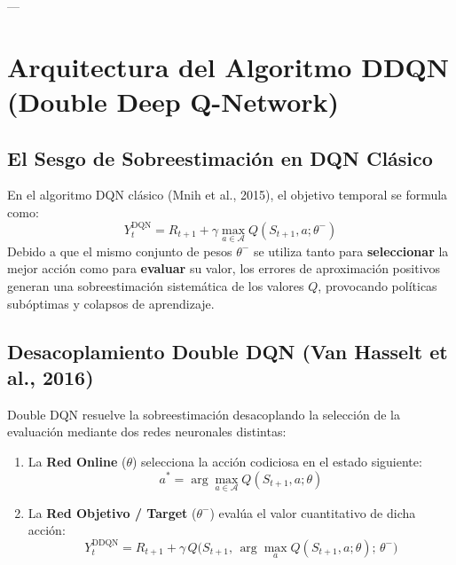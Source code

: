 \documentclass[11pt,letterpaper]{article}
\begin{document}
---

\section{Arquitectura del Algoritmo DDQN (Double Deep Q-Network)}

\subsection{El Sesgo de Sobreestimación en DQN Clásico}
En el algoritmo DQN clásico (Mnih et al., 2015), el objetivo temporal se formula como:
\begin{equation}
    Y_t^{\text{DQN}} = R_{t+1} + \gamma \max_{a \in \mathcal{A}} Q(S_{t+1}, a; \theta^-)
\end{equation}
Debido a que el mismo conjunto de pesos $\theta^-$ se utiliza tanto para \textbf{seleccionar} la mejor acción como para \textbf{evaluar} su valor, los errores de aproximación positivos generan una sobreestimación sistemática de los valores $Q$, provocando políticas subóptimas y colapsos de aprendizaje.

\subsection{Desacoplamiento Double DQN (Van Hasselt et al., 2016)}
Double DQN resuelve la sobreestimación desacoplando la selección de la evaluación mediante dos redes neuronales distintas:
\begin{enumerate}
    \item La \textbf{Red Online} ($\theta$) selecciona la acción codiciosa en el estado siguiente:
    \begin{equation}
        a^* = \arg\max_{a \in \mathcal{A}} Q(S_{t+1}, a; \theta)
    \end{equation}
    \item La \textbf{Red Objetivo / Target} ($\theta^-$) evalúa el valor cuantitativo de dicha acción:
    \begin{equation}
        Y_t^{\text{DDQN}} = R_{t+1} + \gamma \, Q\big(S_{t+1}, \, \arg\max_a Q(S_{t+1}, a; \theta); \, \theta^-\big)
    \end{equation}
\end{enumerate}
\end{document}
